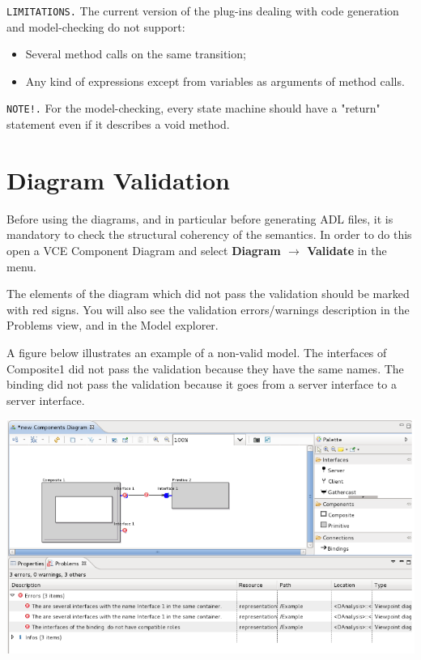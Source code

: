 \documentclass[12pt]{article}
\begin{document}
\texttt{LIMITATIONS.} The current version of the plug-ins dealing with code generation and model-checking do not support:

\begin{itemize}
\item
Several method calls on the same transition;
\item
Any kind of expressions except from variables as arguments of method calls.
\end{itemize}

\texttt{NOTE!.} For the model-checking, every state machine should have a "return" statement even if it describes a void method.

\section{Diagram Validation}
Before using the diagrams, and in particular before generating ADL files, it is mandatory to check the structural coherency of the semantics. In order to do this open a VCE Component Diagram and select \textbf{Diagram $\rightarrow$ Validate} in the menu. 

The elements of the diagram which did not pass the validation should be marked with red signs. You will also see the validation errors/warnings description in the Problems view, and in the Model explorer.

A figure below illustrates an example of a non-valid model. The interfaces of Composite1 did not pass the validation because they have the same names. The binding did not pass the validation because it goes from a server interface to a server interface.

     \centerline{
     \includegraphics[width=14cm]{draws/valid.png}
     \label{fig:vce-proj}
     }
\end{document}
